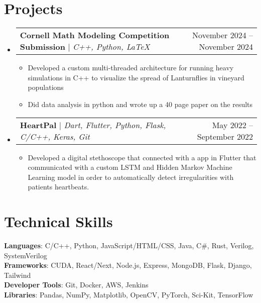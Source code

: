 \documentclass[letterpaper,11pt]{article}
\makeatletter
\newcommand{\resumeItem}[1]{
  \item\small{
    {#1 \vspace{-2pt}}
  }
}
\newcommand{\resumeProjectHeading}[2]{
    \item
    \begin{tabular*}{0.97\textwidth}{l@{\extracolsep{\fill}}r}
      \small#1 & #2 \\
    \end{tabular*}\vspace{-7pt}
}
\newcommand{\resumeSubHeadingListStart}{\begin{itemize}[leftmargin=0.15in, label={}]}
\newcommand{\resumeSubHeadingListEnd}{\end{itemize}}
\newcommand{\resumeItemListStart}{\begin{itemize}}
\newcommand{\resumeItemListEnd}{\end{itemize}\vspace{-5pt}}
\makeatother
\begin{document}
\section{Projects}
    \resumeSubHeadingListStart
      \resumeProjectHeading
          {\textbf{Cornell Math Modeling Competition Submission} $|$ \emph{C++, Python, LaTeX}}{November 2024 -- November 2024}
          \resumeItemListStart
            \resumeItem{Developed a custom multi-threaded architecture for running heavy simulations in C++ to visualize the spread of Lanturnflies in vineyard populations }
            \resumeItem{Did data analysis in python and wrote up a 40 page paper on the results}
          \resumeItemListEnd
      \resumeProjectHeading
          {\textbf{HeartPal} $|$ \emph{Dart, Flutter, Python, Flask, C/C++, Keras, Git}}{May 2022 -- September 2022}
          \resumeItemListStart
            \resumeItem{Developed a digital stethoscope that connected with a app in Flutter that communicated with a custom LSTM and Hidden Markov Machine Learning model in order to automatically detect irregularities with patients heartbeats.}
          \resumeItemListEnd
    \resumeSubHeadingListEnd

%
\section{Technical Skills}
 \begin{itemize}[leftmargin=0.15in, label={}]
    \small{\item{
     \textbf{Languages}{: C/C++, Python, JavaScript/HTML/CSS, Java, C\#, Rust, Verilog, SystemVerilog} \\
     \textbf{Frameworks}{: CUDA, React/Next, Node.js, Express, MongoDB, Flask, Django, Tailwind} \\
     \textbf{Developer Tools}{: Git, Docker, AWS, Jenkins} \\
     \textbf{Libraries}{: Pandas, NumPy, Matplotlib, OpenCV, PyTorch, Sci-Kit, TensorFlow}
    }}
 \end{itemize}


\end{document}
